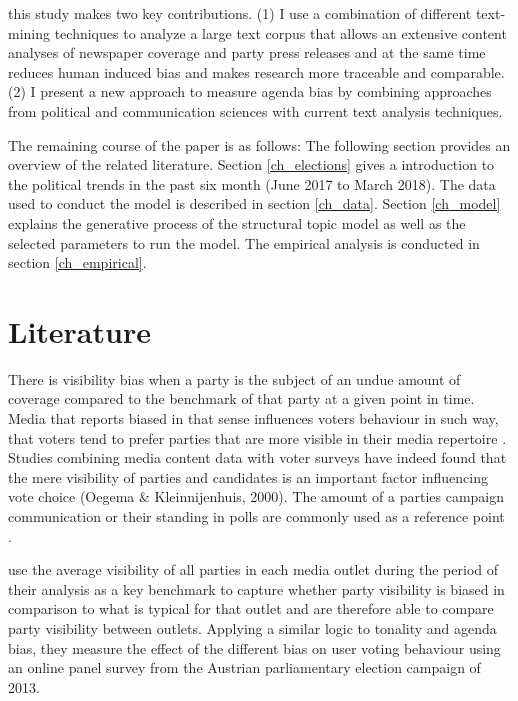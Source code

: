 \documentclass[12pt,a4paper,notitlepage]{article}
\begin{document}

this study makes two key contributions. (1) I use a combination of different text-mining techniques to analyze a large text corpus that allows an extensive content analyses of newspaper coverage and party press releases and at the same time reduces human induced bias and makes research more traceable and comparable. (2) I present a new approach to measure agenda bias by combining approaches from political and communication sciences with current text analysis techniques.    


The remaining course of the paper is as follows: The following section provides an overview of the related literature. Section \ref{ch_elections} gives a introduction to the political trends in the past six month (June 2017 to March 2018). The data used to conduct the model is described in section \ref{ch_data}. Section \ref{ch_model} explains the generative process of the structural topic model as well as the selected parameters to run the model. The empirical analysis is conducted in section \ref{ch_empirical}. 


\section{Literature}

There is visibility bias when a party is the subject of an undue amount of coverage compared to the benchmark of that party at a given point in time. Media that reports biased in that sense influences voters behaviour in such way, that voters tend to prefer parties that are more visible in their media repertoire \citep{eberl_one_2017}. Studies combining media content data with voter surveys have indeed found that the mere visibility of parties and candidates is an important factor influencing vote choice (Oegema & Kleinnijenhuis, 2000). The amount of a parties campaign communication or their standing in polls are commonly used as a reference point \citep{junque_de_fortuny_media_2012, hopmann_political_2012}. 

\citet{eberl_one_2017} use the average visibility of all parties in each media outlet during the period of their analysis as a key benchmark to capture whether party visibility is biased in comparison to what is typical for that outlet and are therefore able to compare party visibility between outlets. Applying a similar logic to tonality and agenda bias, they measure the effect of the different bias on user voting behaviour using an online panel survey from the Austrian parliamentary election campaign of 2013. 
\end{document}
